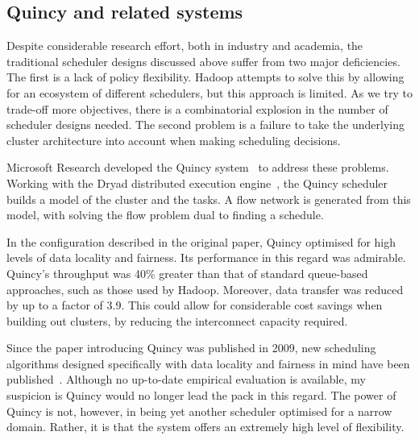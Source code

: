 \subsection{Quincy and related systems} \label{sec:prep-scheduling-quincy}

Despite considerable research effort, both in industry and academia, the traditional scheduler designs discussed above suffer from two major deficiencies. The first is a lack of policy flexibility. Hadoop attempts to solve this by allowing for an ecosystem of different schedulers, but this approach is limited. As we try to trade-off more objectives, there is a combinatorial explosion in the number of scheduler designs needed. The second problem is a failure to take the underlying cluster architecture into account when making scheduling decisions.

Microsoft Research developed the Quincy system~\cite{Isard:2009} to address these problems. Working with the Dryad distributed execution engine~\cite{Isard:2007}\footnotemark, the Quincy scheduler builds a model of the cluster and the tasks. A flow network is generated from this model, with solving the flow problem dual to finding a schedule.

In the configuration described in the original paper, Quincy optimised for high levels of data locality and fairness. Its performance in this regard was admirable. Quincy's throughput was 40\% greater than that of standard queue-based approaches, such as those used by Hadoop. Moreover, data transfer was reduced by up to a factor of 3.9. This could allow for considerable cost savings when building out clusters, by reducing the interconnect capacity required.

Since the paper introducing Quincy was published in 2009, new scheduling algorithms designed specifically with data locality and fairness in mind have been published~\cite{Guo:2012,Jin:2011,Ibrahim:2010}. Although no up-to-date empirical evaluation is available, my suspicion is Quincy would no longer lead the pack in this regard. The power of Quincy is not, however, in being yet another scheduler optimised for a narrow domain. Rather, it is that the system offers an extremely high level of flexibility.


